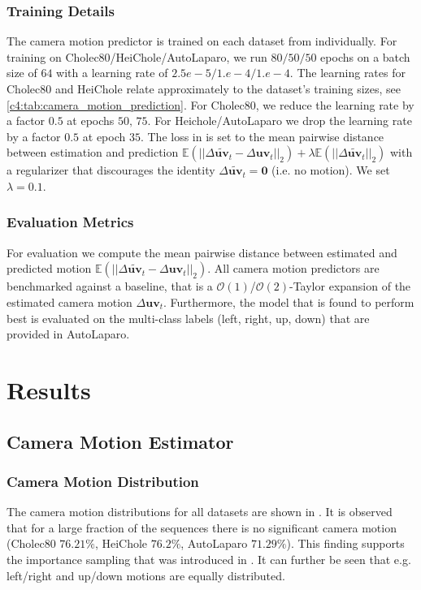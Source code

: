\subsubsection{Training Details}
The camera motion predictor is trained on each dataset from  individually. For training on Cholec80/HeiChole/AutoLaparo, we run $80/50/50$ epochs on a batch size of $64$ with a learning rate of $2.5e-5/1.e-4/1.e-4$. The learning rates for Cholec80 and HeiChole relate approximately to the dataset's training sizes, see \ref{c4:tab:camera_motion_prediction}. For Cholec80, we reduce the learning rate by a factor $0.5$ at epochs $50,\,75$. For Heichole/AutoLaparo we drop the learning rate by a factor $0.5$ at epoch $35$. The loss in  is set to the mean pairwise distance between estimation and prediction $\mathbb{E}(||\Delta\tilde{\mathbf{uv}}_t - \Delta\mathbf{uv}_t||_2) + \lambda \mathbb{E}(||\Delta\tilde{\mathbf{uv}}_t||_2)$ with a regularizer that discourages the identity $\Delta\tilde{\mathbf{uv}}_t = \mathbf{0}$ (i.e. no motion). We set $\lambda = 0.1$.

\subsubsection{Evaluation Metrics}
For evaluation we compute the mean pairwise distance between estimated and predicted motion $\mathbb{E}(||\Delta\tilde{\mathbf{uv}}_t - \Delta\mathbf{uv}_t||_2)$. All camera motion predictors are benchmarked against a baseline, that is a $\mathcal{O}(1)$/$\mathcal{O}(2)$-Taylor expansion of the estimated camera motion $\Delta\mathbf{uv}_t$. Furthermore, the model that is found to perform best is evaluated on the multi-class labels (left, right, up, down) that are provided in AutoLaparo. 

\section{Results}
\subsection{Camera Motion Estimator}
\subsubsection{Camera Motion Distribution}
The camera motion distributions for all datasets are shown in . It is observed that for a large fraction of the sequences there is no significant camera motion (Cholec80 $76.21\%$, HeiChole $76.2\%$, AutoLaparo $71.29\%$). This finding supports the importance sampling that was introduced in . It can further be seen that e.g. left/right and up/down motions are equally distributed.

